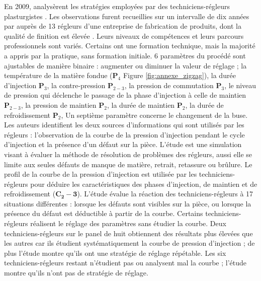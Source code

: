 En 2009, \citeauthor{richard_analyse_2009} analysèrent les stratégies employées par des techniciens-régleurs plasturgistes \cite{richard_analyse_2009}.
Les observations furent recueillies sur un intervalle de dix années par \citeauthor{pastre_role_2004} \cite{pastre_role_1994, pastre_role_2004} auprès de 13 régleurs d’une entreprise de fabrication de produits, dont la qualité de finition est élevée \cite{pastre_role_1994, pastre_role_2004}.
Leurs niveaux de compétences et leurs parcours professionnels sont variés.
Certains ont une formation technique, mais la majorité a appris par la pratique, sans formation initiale.
6 paramètres du procédé sont ajustables de manière binaire : augmenter ou diminuer la valeur de réglage ; la température de la matière fondue ($\boldsymbol{P}_4$ Figure \ref{fig:annexe_zigzag}), la durée d'injection $\boldsymbol{P}_3$, la contre-pression $\boldsymbol{P}_{2-3}$, la pression de commutation $\boldsymbol{P}_3$, le niveau de pression qui déclenche le passage de la phase d'injection à celle de maintien $\boldsymbol{P}_{2-3}$, la pression de maintien $\boldsymbol{P}_2$, la durée de maintien $\boldsymbol{P}_2$, la durée de refroidissement $\boldsymbol{P}_2$,
Un septième paramètre concerne le changement de la buse.
Les auteurs identifient les deux sources d'informations qui sont utilisés par les régleurs : l'observation de la courbe de la pression d'injection pendant le cycle d'injection et la présence d'un défaut sur la pièce.
L'étude est une simulation visant à évaluer la méthode de résolution de problèmes des régleurs, aussi elle se limite aux seules défauts de manque de matière, retrait, retassure ou brûlure.
Le profil de la courbe de la pression d'injection est utilisée par les techniciens-régleurs pour déduire les caractéristiques des phases d'injection, de maintien et de refroidissement ($\boldsymbol{C_2-3}$).
L'étude évalue la réaction des techniciens-régleurs à 17 situations différentes : lorsque les défauts sont visibles sur la pièce, ou lorsque la présence du défaut est déductible à partir de la courbe.
Certains techniciens-régleurs réalisent le réglage des paramètres sans étudier la courbe.
Deux techniciens-régleurs sur le panel de huit obtiennent des résultats plus élevées que les autres car ils étudient systématiquement la courbe de pression d'injection ; de plus l'étude montre qu'ils ont une stratégie de réglage répétable.
Les six techniciens-régleurs restant n'étudient pas ou analysent mal la courbe ; l'étude montre qu'ils n'ont pas de stratégie de réglage.
